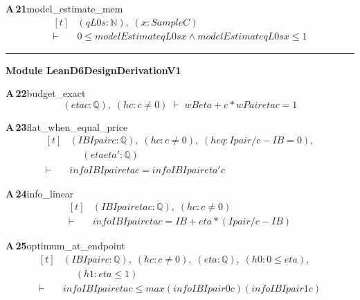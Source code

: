 \documentclass[conference]{IEEEtran}
\theoremstyle{definition}
\newcommand{\lean}[1]{\textsf{\footnotesize #1}}
\begin{document}
\noindent\textbf{A\,21}\quad\lean{model\_estimate\_mem}
{\footnotesize\[ \begin{aligned}[t]
&(\mathit{q} \mathit{L0} \mathit{s} : \mathbb{N} ),\; (\mathit{x} : \mathit{Sample} \mathit{C})\\
\vdash\;&0 \leq \mathit{modelEstimate} \mathit{q} \mathit{L0} \mathit{s} \mathit{x} \wedge \mathit{modelEstimate} \mathit{q} \mathit{L0} \mathit{s} \mathit{x} \leq 1
\end{aligned} \]}

\vspace{4pt}\noindent\rule{\columnwidth}{0.4pt}\par\vspace{2pt}
\noindent\textbf{Module \lean{LeanD6DesignDerivationV1}}\par\vspace{3pt}

\noindent\textbf{A\,22}\quad\lean{budget\_exact}
{\footnotesize\[ (\mathit{eta} \mathit{c} : \mathbb{Q} ),\; (\mathit{hc} : \mathit{c} \neq 0) \;\vdash\; \mathit{wB} \mathit{eta} + \mathit{c} * \mathit{wPair} \mathit{eta} \mathit{c} = 1 \]}

\noindent\textbf{A\,23}\quad\lean{flat\_when\_equal\_price}
{\footnotesize\[ \begin{aligned}[t]
&(\mathit{IB} \mathit{Ipair} \mathit{c} : \mathbb{Q} ),\; (\mathit{hc} : \mathit{c} \neq 0),\; (\mathit{heq} : \mathit{Ipair} / \mathit{c} - \mathit{IB} = 0),\\
&\quad \; (\mathit{eta} \mathit{eta'} : \mathbb{Q} )\\
\vdash\;&\mathit{info} \mathit{IB} \mathit{Ipair} \mathit{eta} \mathit{c} = \mathit{info} \mathit{IB} \mathit{Ipair} \mathit{eta'} \mathit{c}
\end{aligned} \]}

\noindent\textbf{A\,24}\quad\lean{info\_linear}
{\footnotesize\[ \begin{aligned}[t]
&(\mathit{IB} \mathit{Ipair} \mathit{eta} \mathit{c} : \mathbb{Q} ),\; (\mathit{hc} : \mathit{c} \neq 0)\\
\vdash\;&\mathit{info} \mathit{IB} \mathit{Ipair} \mathit{eta} \mathit{c} = \mathit{IB} + \mathit{eta} * (\mathit{Ipair} / \mathit{c} - \mathit{IB})
\end{aligned} \]}

\noindent\textbf{A\,25}\quad\lean{optimum\_at\_endpoint}
{\footnotesize\[ \begin{aligned}[t]
&(\mathit{IB} \mathit{Ipair} \mathit{c} : \mathbb{Q} ),\; (\mathit{hc} : \mathit{c} \neq 0),\; (\mathit{eta} : \mathbb{Q} ),\; (\mathit{h0} : 0 \leq \mathit{eta}),\\
&\quad \; (\mathit{h1} : \mathit{eta} \leq 1)\\
\vdash\;&\mathit{info} \mathit{IB} \mathit{Ipair} \mathit{eta} \mathit{c} \leq \mathit{max} (\mathit{info} \mathit{IB} \mathit{Ipair} 0 \mathit{c}) (\mathit{info} \mathit{IB} \mathit{Ipair} 1 \mathit{c})
\end{aligned} \]}
\end{document}

